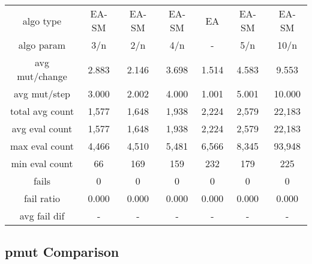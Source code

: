 \begin{tabular}[h]{ccccccc}
algo type&             EA-SM&      EA-SM&      EA-SM&         EA&      EA-SM&      EA-SM\\
algo param&              3/n&        2/n&        4/n&          -&        5/n&       10/n\\
avg mut/change&        2.883&      2.146&      3.698&      1.514&      4.583&      9.553\\
avg mut/step&          3.000&      2.002&      4.000&      1.001&      5.001&     10.000\\
\hline
total avg count&       1,577&      1,648&      1,938&      2,224&      2,579&     22,183\\
avg eval count&        1,577&      1,648&      1,938&      2,224&      2,579&     22,183\\
max eval count&        4,466&      4,510&      5,481&      6,566&      8,345&     93,948\\
min eval count&           66&        169&        159&        232&        179&        225\\
\hline
fails&                     0&          0&          0&          0&          0&          0\\
fail ratio&            0.000&      0.000&      0.000&      0.000&      0.000&      0.000\\
avg fail dif&              -&          -&          -&          -&          -&          -\\
\end{tabular}


\subsection{pmut Comparison}


